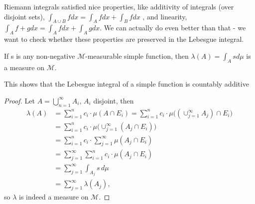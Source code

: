 \documentclass[11pt]{scrartcl}
\begin{document}
Riemann integrals satisfied nice properties, like additivity of integrals (over disjoint sets), $\int_{A\cup B} f dx =\int_{A} f dx + \int_{B} f dx$ , and linearity, $ \int_{A} f + g dx = \int_{A} f dx + \int_{A} g dx$. We can actually do even better than that - we want to check whether these properties are preserved in the Lebesgue integral.
\begin{theorem}
If s is any non-negative $\mathcal{M}$-measurable simple function, then $\lambda(A) = \int_A s d\mu $ is a measure on $\mathcal{M}$.
\end{theorem}
\begin{remark}
This shows that the Lebesgue integral of a simple function is countably additive
\end{remark}
\begin{proof}
Let $A = \bigcup_{n=1}^\infty A_i$, $A_i$ disjoint, then
\begin{align*}
\lambda(A)&=\sum^n_{i=1}c_i\cdot\mu(A\cap E_i) =\sum^n_{i=1}c_i\cdot\mu\bigl((\cup^\infty_{j=1}A_j)\cap E_i\bigr)\\
      &=\sum^n_{i=1}c_i\cdot\mu\bigl(\cup^\infty_{j=1}(A_j\cap E_i)\bigr)\\
      &=\sum^n_{i=1}c_i\cdot\sum^\infty_{j=1}\mu(A_j\cap E_i)\\
      &=\sum^\infty_{j=1}\sum^n_{i=1}c_i\cdot \mu(A_j\cap E_i)\\
	  &=\sum^\infty_{j=1}\int_{A_j} s\,d\mu\\
      &=\sum^\infty_{j=1}\lambda(A_j),
\end{align*}
so $\lambda$ is indeed a measure on $\mathcal{M}$.
\end{proof}
\end{document}
